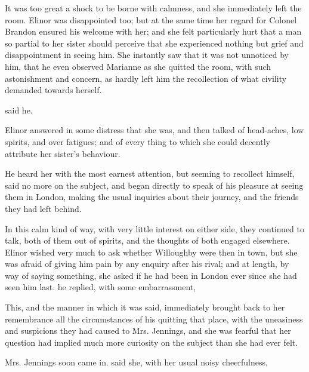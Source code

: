 It was too great a shock to be borne with calmness, and she immediately left the room. Elinor was disappointed too; but at the same time her regard for Colonel Brandon ensured his welcome with her; and she felt particularly hurt that a man so partial to her sister should perceive that she experienced nothing but grief and disappointment in seeing him. She instantly saw that it was not unnoticed by him, that he even observed Marianne as she quitted the room, with such astonishment and concern, as hardly left him the recollection of what civility demanded towards herself.

 said he.

Elinor answered in some distress that she was, and then talked of head-aches, low spirits, and over fatigues; and of every thing to which she could decently attribute her sister's behaviour.

He heard her with the most earnest attention, but seeming to recollect himself, said no more on the subject, and began directly to speak of his pleasure at seeing them in London, making the usual inquiries about their journey, and the friends they had left behind.

In this calm kind of way, with very little interest on either side, they continued to talk, both of them out of spirits, and the thoughts of both engaged elsewhere. Elinor wished very much to ask whether Willoughby were then in town, but she was afraid of giving him pain by any enquiry after his rival; and at length, by way of saying something, she asked if he had been in London ever since she had seen him last.  he replied, with some embarrassment, 

This, and the manner in which it was said, immediately brought back to her remembrance all the circumstances of his quitting that place, with the uneasiness and suspicions they had caused to Mrs. Jennings, and she was fearful that her question had implied much more curiosity on the subject than she had ever felt.

Mrs. Jennings soon came in.  said she, with her usual noisy cheerfulness, 

